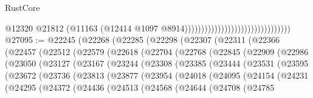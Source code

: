 \begin{lexlean}{RustCore}
\begin{coremodule}
                                                                @12320
                                                                @21812
                                                                (@11163
                                                                  (@12414
                                                                    @1097
                                                                    @8914))))))))))))))))))))))))))))))))
@27095 := @22245
    (@22268
      (@22285
        (@22298
          (@22307
            (@22311
              (@22366
                (@22457
                  (@22512
                    (@22579
                      (@22618
                        (@22704
                          (@22768
                            (@22845
                              (@22909
                                (@22986
                                  (@23050
                                    (@23127
                                      (@23167
                                        (@23244
                                          (@23308
                                            (@23385
                                              (@23444
                                                (@23531
                                                  (@23595
                                                    (@23672
                                                      (@23736
                                                        (@23813
                                                          (@23877
                                                            (@23954
                                                              (@24018
                                                                (@24095
                                                                  (@24154
                                                                    (@24231
                                                                      (@24295
                                                                        (@24372
                                                                          (@24436
                                                                            (@24513
                                                                              (@24568
                                                                                (@24644
                                                                                  (@24708
                                                                                    (@24785

\end{coremodule}
\end{lexlean}
